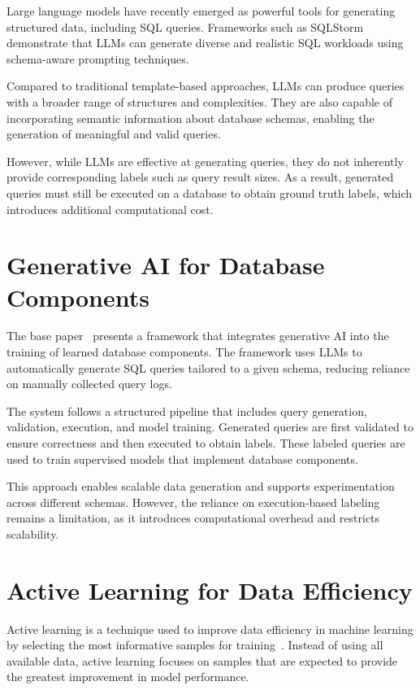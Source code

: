 Large language models have recently emerged as powerful tools for generating structured data, including SQL queries. Frameworks such as SQLStorm~\cite{DBLP:journals/pvldb/SchmidtLBN25} demonstrate that LLMs can generate diverse and realistic SQL workloads using schema-aware prompting techniques.

Compared to traditional template-based approaches, LLMs can produce queries with a broader range of structures and complexities. They are also capable of incorporating semantic information about database schemas, enabling the generation of meaningful and valid queries.

However, while LLMs are effective at generating queries, they do not inherently provide corresponding labels such as query result sizes. As a result, generated queries must still be executed on a database to obtain ground truth labels, which introduces additional computational cost.

\section{Generative AI for Database Components}

The base paper~\cite{DBLP:journals/corr/abs-2512-20271} presents a framework that integrates generative AI into the training of learned database components. The framework uses LLMs to automatically generate SQL queries tailored to a given schema, reducing reliance on manually collected query logs.

The system follows a structured pipeline that includes query generation, validation, execution, and model training. Generated queries are first validated to ensure correctness and then executed to obtain labels. These labeled queries are used to train supervised models that implement database components.

This approach enables scalable data generation and supports experimentation across different schemas. However, the reliance on execution-based labeling remains a limitation, as it introduces computational overhead and restricts scalability.

\section{Active Learning for Data Efficiency}

Active learning is a technique used to improve data efficiency in machine learning by selecting the most informative samples for training~\cite{DBLP:journals/tnn/LiWCJDO25}. Instead of using all available data, active learning focuses on samples that are expected to provide the greatest improvement in model performance.

